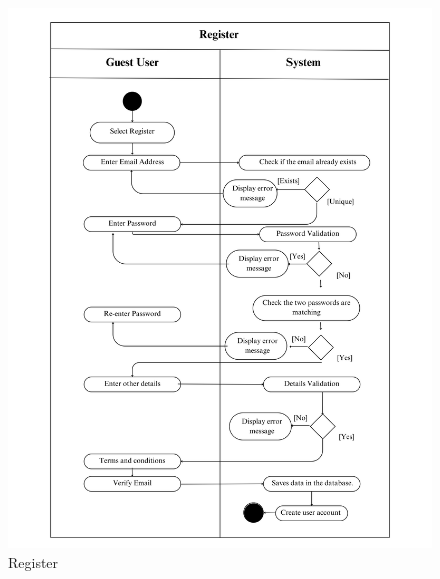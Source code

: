 \begin{figure}[h!]
    \centering
    \includegraphics[width=1\textwidth]{Images/Activity Diagrams/1 Register crop.png}
    \caption{Register}
    \label{fig:activity-register}
\end{figure}

